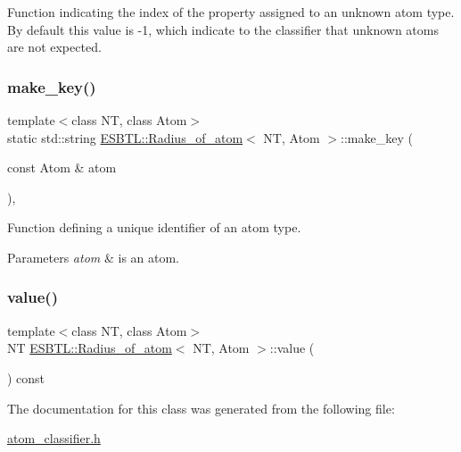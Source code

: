 Function indicating the index of the property assigned to an unknown atom type. By default this value is -\/1, which indicate to the classifier that unknown atoms are not expected. \mbox{\label{classESBTL_1_1Radius__of__atom_a97a8af8d7d49ffd8ba51819edeed37ef}} 
\subsubsection{\texorpdfstring{make\+\_\+key()}{make\_key()}}
{\footnotesize\ttfamily template$<$class NT, class Atom$>$ \\
static std\+::string \hyperlink{classESBTL_1_1Radius__of__atom}{E\+S\+B\+T\+L\+::\+Radius\+\_\+of\+\_\+atom}$<$ NT, Atom $>$\+::make\+\_\+key (\begin{DoxyParamCaption}\item[{const Atom \&}]{atom }\end{DoxyParamCaption})\hspace{0.3cm}{\ttfamily [inline]}, {\ttfamily [static]}}

Function defining a unique identifier of an atom type. 
\begin{DoxyParams}{Parameters}
{\em atom} & is an atom. \\
\hline
\end{DoxyParams}
\mbox{\label{classESBTL_1_1Radius__of__atom_ae6747f36b286d7295f98b319cad467a0}} 
\subsubsection{\texorpdfstring{value()}{value()}}
{\footnotesize\ttfamily template$<$class NT, class Atom$>$ \\
NT \hyperlink{classESBTL_1_1Radius__of__atom}{E\+S\+B\+T\+L\+::\+Radius\+\_\+of\+\_\+atom}$<$ NT, Atom $>$\+::value (\begin{DoxyParamCaption}{ }\end{DoxyParamCaption}) const\hspace{0.3cm}{\ttfamily [inline]}}



The documentation for this class was generated from the following file\+:\begin{DoxyCompactItemize}
\item 
\hyperlink{atom__classifier_8h}{atom\+\_\+classifier.\+h}\end{DoxyCompactItemize}
